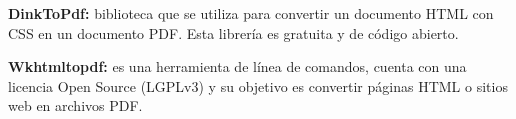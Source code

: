 \textbf{DinkToPdf: } biblioteca que se utiliza para convertir un documento HTML con CSS en un documento PDF. Esta librería es gratuita y de código abierto.

\textbf{Wkhtmltopdf: } es una herramienta de línea de comandos, cuenta con una licencia Open Source (LGPLv3) y su objetivo es convertir páginas HTML o sitios web en archivos PDF.